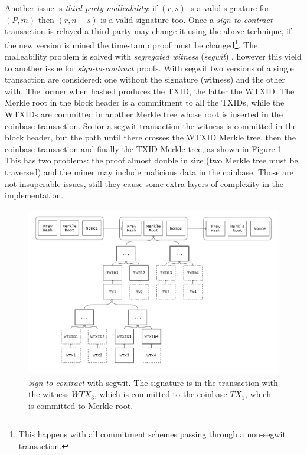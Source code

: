 Another issue is \textit{third party malleability}:
if $(r,s)$ is a valid signature for $(P,m)$ then $(r,n-s)$ is a valid signature too. Once a \textit{sign-to-contract} transaction is relayed a third party may change it using the above technique, if the new version is mined the timestamp proof must be changed\footnote{This happens with all commitment schemes passing through a non-segwit transaction.}.
The malleability problem is solved with \textit{segregated witness} (\textit{segwit}) \cite{BIP141}, however this yield to another issue for \textit{sign-to-contract} proofs.
With segwit two versions of a single transaction are considered: one without the signature (witness) and the other with. 
The former when hashed produces the TXID, the latter the WTXID.
The Merkle root in the block header is a commitment to all the TXIDs, while the WTXIDs are committed in another Merkle tree whose root is inserted in the coinbase transaction. So for a segwit transaction the witness is committed in the block header, but the path until there crosses the WTXID Merkle tree, then the coinbase transaction and finally the TXID Merkle tree, as shown in Figure \ref{fig:s2c-segwit}. 
This has two problems: the proof almost double in size (two Merkle tree must be traversed) and the miner may include malicious data in the coinbase. Those are not insuperable issues, still they cause some extra layers of complexity in the implementation.

\begin{figure}
	\begin{center}
		\includegraphics[width=\linewidth]{Images/bitcoin-chain-s2c-segwit.png}
		\caption[\textit{sign-to-contract} with segwit]{\textit{sign-to-contract} with segwit. The signature is in the transaction with the witness $WTX_3$, which is committed to the coinbase $TX_1$, which is committed to Merkle root.}
		\label{fig:s2c-segwit}
	\end{center}
\end{figure} 



